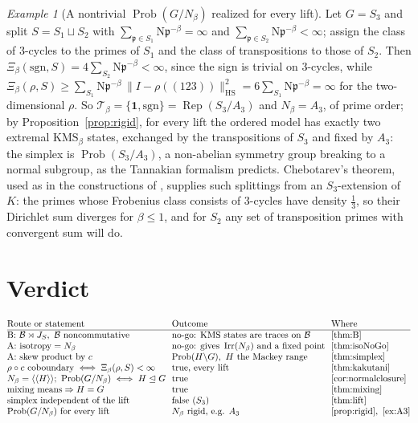 \documentclass[11pt]{amsart}
\numberwithin{equation}{section}
\theoremstyle{definition}
\theoremstyle{remark}
\newtheorem{example}[theorem]{Example}
\newcommand{\cB}{\mathcal{B}}
\newcommand{\cT}{\mathcal{T}}
\newcommand{\pp}{\mathfrak{p}}
\newcommand{\Ns}{\mathrm{N}}
\newcommand{\Rep}{\operatorname{Rep}}
\newcommand{\Irr}{\operatorname{Irr}}
\newcommand{\HS}{\mathrm{HS}}
\newcommand{\Prob}{\operatorname{Prob}}
\begin{document}
\begin{example}[A nontrivial $\Prob(G/N_\beta)$ realized for every lift]\label{ex:A3}
Let $G=S_3$ and split $S=S_1\sqcup S_2$ with $\sum_{\pp\in S_1}\Ns\pp^{-\beta}=\infty$ and
$\sum_{\pp\in S_2}\Ns\pp^{-\beta}<\infty$; assign the class of $3$-cycles to the primes of $S_1$
and the class of transpositions to those of $S_2$. Then
$\Xi_\beta(\mathrm{sgn},S)=4\sum_{S_2}\Ns\pp^{-\beta}<\infty$, since the sign is trivial on
$3$-cycles, while $\Xi_\beta(\rho,S)\ge\sum_{S_1}\Ns\pp^{-\beta}\,\|I-\rho((123))\|_{\HS}^2=6\sum_{S_1}\Ns\pp^{-\beta}=\infty$
for the two-dimensional $\rho$. So $\cT_\beta=\{\mathbf 1,\mathrm{sgn}\}=\Rep(S_3/A_3)$ and
$N_\beta=A_3$, of prime order; by Proposition~\ref{prop:rigid}, for every lift the ordered
model has exactly two extremal $\mathrm{KMS}_\beta$ states, exchanged by the transpositions
of $S_3$ and fixed by $A_3$: the simplex is $\Prob(S_3/A_3)$, a non-abelian symmetry group
breaking to a normal subgroup, as the Tannakian formalism predicts. Chebotarev's theorem,
used as in the constructions of \cite[\S5]{SeriesI}, supplies such splittings from an
$S_3$-extension of $K$: the primes whose Frobenius class consists of $3$-cycles have density
$\frac13$, so their Dirichlet sum diverges for $\beta\le1$, and for $S_2$ any set of
transposition primes with convergent sum will do.
\end{example}

\section{Verdict}

\[
\begin{array}{@{}l@{\ \ }l@{\ \ }l@{}}
\text{Route or statement} & \text{Outcome} & \text{Where}\\\hline
\text{B: }\cB\rtimes J_S,\ \cB\text{ noncommutative} & \text{no-go: KMS states are traces on }\cB & \ref{thm:B}\\
\text{A: isotropy}=N_\beta & \text{no-go: gives }\Irr(N_\beta)\text{ and a fixed point} & \ref{thm:isoNoGo}\\
\text{A: skew product by }c & \Prob(H\backslash G),\ H\text{ the Mackey range} & \ref{thm:simplex}\\
\rho\circ c\ \text{coboundary}\iff\Xi_\beta(\rho,S)<\infty & \text{true, every lift} & \ref{thm:kakutani}\\
N_\beta=\langle\langle H\rangle\rangle;\ \Prob(G/N_\beta)\iff H\trianglelefteq G & \text{true} & \ref{cor:normalclosure}\\
\text{mixing means}\Rightarrow H=G & \text{true} & \ref{thm:mixing}\\
\text{simplex independent of the lift} & \text{false }(S_3) & \ref{thm:lift}\\
\Prob(G/N_\beta)\ \text{for every lift} & N_\beta\text{ rigid, e.g. }A_3 & \ref{prop:rigid},\ \ref{ex:A3}
\end{array}
\]
\end{document}
